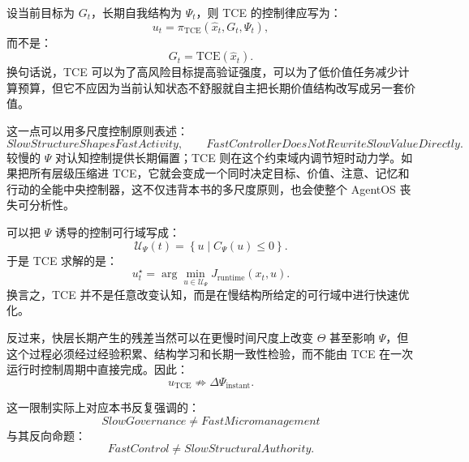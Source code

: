 设当前目标为 $G_t$，长期自我结构为 $\Psi_t$，则 TCE 的控制律应写为：
\begin{equation}
    u_t
    =
    \pi_{\mathrm{TCE}}
    (
    \hat x_t,
    G_t,
    \Psi_t
    ),
\end{equation}
而不是：
\begin{equation}
    G_t
    =
    \mathrm{TCE}(\hat x_t).
\end{equation}
换句话说，TCE 可以为了高风险目标提高验证强度，可以为了低价值任务减少计算预算，但它不应因为当前认知状态不舒服就自主把长期价值结构改写成另一套价值。

这一点可以用多尺度控制原则表述：
\begin{equation}
    \boxed{
    SlowStructureShapesFastActivity,
    \qquad
    FastControllerDoesNotRewriteSlowValueDirectly.
    }
\end{equation}
较慢的 $\Psi$ 对认知控制提供长期偏置；TCE 则在这个约束域内调节短时动力学。如果把所有层级压缩进 TCE，它就会变成一个同时决定目标、价值、注意、记忆和行动的全能中央控制器，这不仅违背本书的多尺度原则，也会使整个 AgentOS 丧失可分析性。

可以把 $\Psi$ 诱导的控制可行域写成：
\begin{equation}
    \mathcal U_{\Psi}(t)
    =
    \left\{
    u
    \mid
    C_{\Psi}(u)\le 0
    \right\}.
\end{equation}
于是 TCE 求解的是：
\begin{equation}
    u_t^\star
    =
    \arg\min_{u\in\mathcal U_{\Psi}}
    J_{\mathrm{runtime}}(x_t,u).
\end{equation}
换言之，TCE 并不是任意改变认知，而是在慢结构所给定的可行域中进行快速优化。

反过来，快层长期产生的残差当然可以在更慢时间尺度上改变 $\Theta$ 甚至影响 $\Psi$，但这个过程必须经过经验积累、结构学习和长期一致性检验，而不能由 TCE 在一次运行时控制周期中直接完成。因此：
\begin{equation}
    u_{\mathrm{TCE}}
    \not\Rightarrow
    \Delta\Psi_{\mathrm{instant}}.
\end{equation}

这一限制实际上对应本书反复强调的：
\begin{equation}
    \boxed{
    SlowGovernance
    \neq
    FastMicromanagement
    }
\end{equation}
与其反向命题：
\begin{equation}
    \boxed{
    FastControl
    \neq
    SlowStructuralAuthority.
    }
\end{equation}

